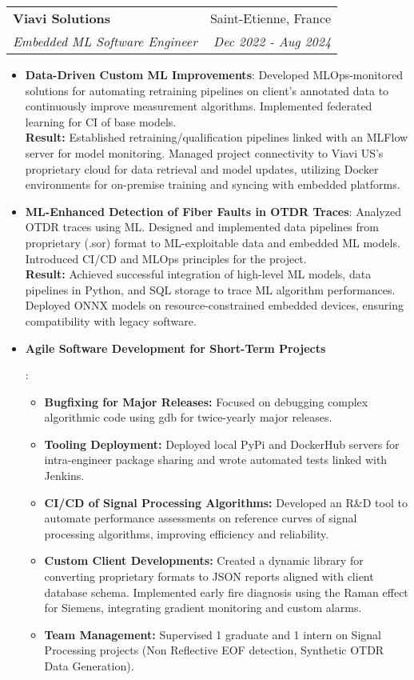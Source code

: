 \documentclass[letterpaper,11pt]{article}
\makeatletter
\newcommand{\resumeItem}[2]{
  \item\small{
    \textbf{#1}{: #2 \vspace{-2pt}}
  }
}
\newcommand{\resumeSubheading}[4]{
  \vspace{-1pt}\item
    \begin{tabular*}{0.97\textwidth}[t]{l@{\extracolsep{\fill}}r}
      \textbf{#1} & #2 \\
      \textit{\small#3} & \textit{\small #4} \\
    \end{tabular*}\vspace{-5pt}
}
\newcommand{\resumeItemListStart}{\begin{itemize}}
\newcommand{\resumeItemListEnd}{\end{itemize}\vspace{-5pt}}
\makeatother
\begin{document}
\resumeSubheading
    {Viavi Solutions}{Saint-Etienne, France}
    {Embedded ML Software Engineer}{Dec 2022 - Aug 2024}
    \resumeItemListStart
        \resumeItem{Data-Driven Custom ML Improvements}
            {Developed MLOps-monitored solutions for automating retraining pipelines on client's annotated data to continuously improve measurement algorithms. Implemented federated learning for CI of base models.
            \\\textbf{Result:} Established retraining/qualification pipelines linked with an MLFlow server for model monitoring. Managed project connectivity to Viavi US's proprietary cloud for data retrieval and model updates, utilizing Docker environments for on-premise training and syncing with embedded platforms.}
        \resumeItem{ML-Enhanced Detection of Fiber Faults in OTDR Traces}
            {Analyzed OTDR traces using ML. Designed and implemented data pipelines from proprietary (.sor) format to ML-exploitable data and embedded ML models. Introduced CI/CD and MLOps principles for the project.
            \\\textbf{Result:} Achieved successful integration of high-level ML models, data pipelines in Python, and SQL storage to trace ML algorithm performances. Deployed ONNX models on resource-constrained embedded devices, ensuring compatibility with legacy software.}
        \resumeItem{Agile Software Development for Short-Term Projects}
            {
                \begin{itemize}
                    \item \textbf{Bugfixing for Major Releases:} Focused on debugging complex algorithmic code using gdb for twice-yearly major releases.
                    \item \textbf{Tooling Deployment:} Deployed local PyPi and DockerHub servers for intra-engineer package sharing and wrote automated tests linked with Jenkins.
                    \item \textbf{CI/CD of Signal Processing Algorithms:} Developed an R\&D tool to automate performance assessments on reference curves of signal processing algorithms, improving efficiency and reliability.
                    \item \textbf{Custom Client Developments:} Created a dynamic library for converting proprietary formats to JSON reports aligned with client database schema. Implemented early fire diagnosis using the Raman effect for Siemens, integrating gradient monitoring and custom alarms.
                    \item \textbf{Team Management:} Supervised 1 graduate and 1 intern on Signal Processing projects (Non Reflective EOF detection, Synthetic OTDR Data Generation).
                \end{itemize}
            }
    \resumeItemListEnd
\end{document}
